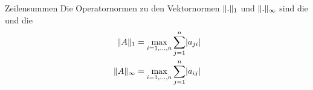\begin{Beispiel}{Zeilensummen}
  Die Operatornormen zu den Vektornormen $\lVert.\rVert_1$ und
  $\lVert.\rVert_\infty$ sind die  und die
  \begin{align}
    \lVert A\rVert_1 &= \max_{i=1,\dots,n} \sum_{j=1}^n \lvert a_{ji}\rvert\\
    \lVert A\rVert_\infty &= \max_{i=1,\dots,n} \sum_{j=1}^n \lvert a_{ij}\rvert
  \end{align}
\end{Beispiel}


